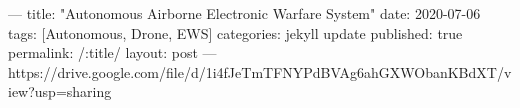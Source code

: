 ---
title: "Autonomous Airborne Electronic Warfare System"
date: 2020-07-06
tags: [Autonomous, Drone, EWS]
categories: jekyll update
published: true
permalink: /:title/
layout: post
---
https://drive.google.com/file/d/1i4fJeTmTFNYPdBVAg6ahGXWObanKBdXT/view?usp=sharing
